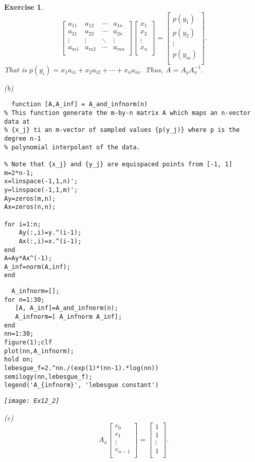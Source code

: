 \documentclass[paper=a4, fontsize=11pt]{scrartcl} %
\numberwithin{equation}{section} %
\numberwithin{figure}{section} %
\numberwithin{table}{section} %
\newtheorem{exercise}{Exercise}
\numberwithin{exercise}{section}
\begin{document}
\begin{exercise}
$$\begin{bmatrix}
a_{11} & a_{12} & \cdots & a_{1n} \\
a_{21} & a_{22} & \cdots & a_{2n} \\
\vdots & \vdots & \ddots & \vdots\\
a_{m1} & a_{m2} & \cdots & a_{mn} \\
\end{bmatrix}\begin{bmatrix}
x_1\\
x_2\\
\vdots\\
x_n\\
\end{bmatrix}=\begin{bmatrix}
p(y_1)\\
p(y_2)\\
\vdots\\
p(y_m)\\
\end{bmatrix}.$$
That is $p(y_i)=x_1 a_{i1}+x_2 a_{i2}+\cdots+ x_n a_{in}$.
Thus, $A=A_{y} A_{x}^{-1}.$

(b)
  \begin{verbatim}
  function [A,A_inf] = A_and_infnorm(n)
% This function generate the m-by-n matrix A which maps an n-vector data at
% {x_j} ti an m-vector of sampled values {p(y_j)} where p is the degree n-1
% polynomial interpolant of the data.

% Note that {x_j} and {y_j} are equispaced points from [-1, 1]
m=2*n-1;
x=linspace(-1,1,n)';
y=linspace(-1,1,m)';
Ay=zeros(m,n);
Ax=zeros(n,n);

for i=1:n;
    Ay(:,i)=y.^(i-1);
    Ax(:,i)=x.^(i-1);
end
A=Ay*Ax^(-1);
A_inf=norm(A,inf);
end
  \end{verbatim}
  
  \begin{verbatim}
  A_infnorm=[];
for n=1:30;
   [A, A_inf]=A_and_infnorm(n);
   A_infnorm=[ A_infnorm A_inf];
end
nn=1:30;
figure(1);clf
plot(nn,A_infnorm);
hold on;
lebesgue_f=2.^nn./(exp(1)*(nn-1).*log(nn))
semilogy(nn,lebesgue_f);
legend('A_{infnorm}', 'lebesgue constant')
  \end{verbatim}
\texttt{[image: Ex12\_2]}


(c)
$$A_{x}\begin{bmatrix}
c_0\\
c_1\\
\vdots\\
c_{n-1}\\
\end{bmatrix}=\begin{bmatrix}
1\\
1\\
\vdots\\
1\\
\end{bmatrix}.$$


\end{exercise}
\end{document}

